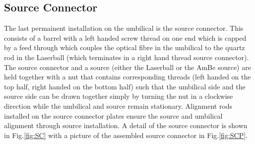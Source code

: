 \documentclass[12pt]{article}
\begin{document}
\subsection{Source Connector}
The last permainent installation on the umbilical is the source
connector. This consists of a barrel with a left handed screw thread
on one end which is capped by a feed through which couples the optical
fibre in the umbilical to the quartz rod in the Laserball (which
terminates in a right hand thread source connector). The source
connector and a source (either the Laserball or the AmBe source) are
held together with a nut that contains corresponding threads (left
handed on the top half, right handed on the bottom half) such that the
umbilical side and the source side can be drawn together simply by
turning the nut in a clockwise direction while the umbilical and
source remain stationary. Alignment rods installed on the source
connector plates ensure the source and umbilical alignment through
source installation. A detail of the source connector is shown in
Fig.\ref{fig:SC} with a picture of the assembled source connector in
Fig.\ref{fig:SCP}.
\end{document}
